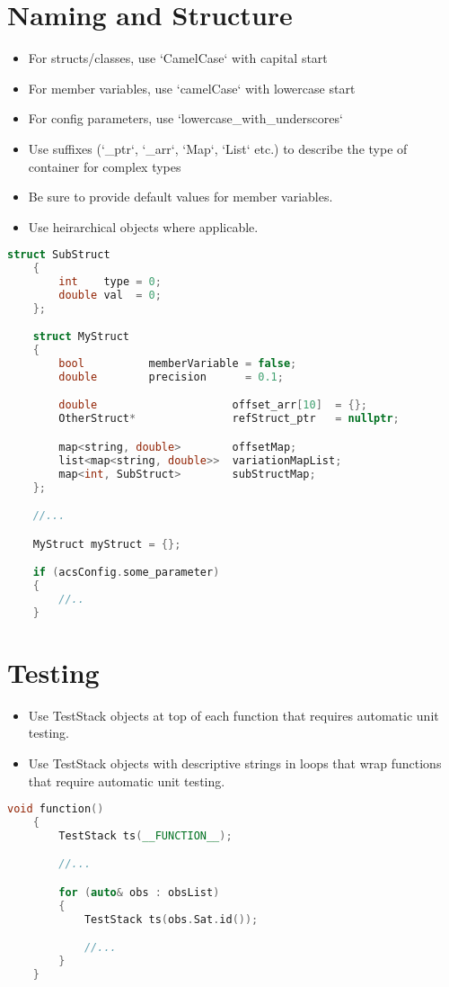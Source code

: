 \section{Naming and Structure}
%
\begin{itemize}
\item For structs/classes, use `CamelCase` with capital start
\item For member variables, use `camelCase` with lowercase start
\item For config parameters, use `lowercase\_with\_underscores`
\item Use suffixes (`\_ptr`, `\_arr`, `Map`, `List` etc.) to describe the type of container for complex types
\item Be sure to provide default values for member variables.
\item Use heirarchical objects where applicable.
\end{itemize}
%
\begin{lstlisting}[language=c++]
    struct SubStruct
    {
        int    type = 0;
        double val  = 0;
    };

    struct MyStruct
    {
        bool          memberVariable = false;
        double        precision      = 0.1;

        double                     offset_arr[10]  = {};
        OtherStruct*               refStruct_ptr   = nullptr;

        map<string, double>        offsetMap; 
        list<map<string, double>>  variationMapList;
        map<int, SubStruct>        subStructMap;
    };

    //...

    MyStruct myStruct = {};

    if (acsConfig.some_parameter)
    {
        //..
    }
\end{lstlisting}
\section{Testing}
\begin{itemize}
	\item Use TestStack objects at top of each function that requires automatic unit testing.
	\item Use TestStack objects with descriptive strings in loops that wrap functions that require automatic unit testing.
\end{itemize}
\begin{lstlisting}[language=c++]
    void function()
    {
        TestStack ts(__FUNCTION__);

        //...

        for (auto& obs : obsList)
        {
            TestStack ts(obs.Sat.id());

            //...
        }
    }
\end{lstlisting}
